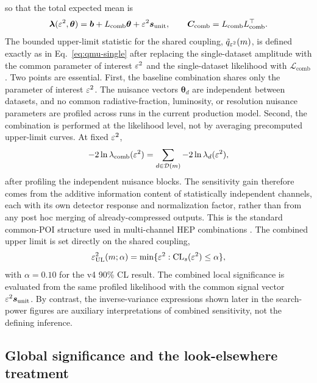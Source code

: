 so that the total expected mean is
\begin{equation}
\bm{\lambda}(\varepsilon^2,\bm{\theta})
= \bm{b} + L_{\mathrm{comb}}\bm{\theta} + \varepsilon^2\bm{s}_{\mathrm{unit}},
\qquad
\bm{C}_{\mathrm{comb}} = L_{\mathrm{comb}}L_{\mathrm{comb}}^\top.
\end{equation}
The bounded upper-limit statistic for the shared coupling,
$\tilde q_{\varepsilon^2}(m)$, is defined exactly as in Eq.~\eqref{eq:qmu-single} after
replacing the single-dataset amplitude with the common parameter of interest
$\varepsilon^2$ and the single-dataset likelihood with
$\mathcal{L}_{\mathrm{comb}}$. Two points are essential. First, the baseline
combination shares only the parameter of interest $\varepsilon^2$. The nuisance vectors
$\bm{\theta}_d$ are independent between datasets, and no common radiative-fraction,
luminosity, or resolution nuisance parameters are profiled across runs in the current
production model. Second, the combination is performed at the likelihood level, not by
averaging precomputed upper-limit curves. At fixed $\varepsilon^2$,
\begin{equation}
-2\ln\lambda_{\mathrm{comb}}(\varepsilon^2)
=
\sum_{d \in \mathcal{D}(m)} -2\ln\lambda_d(\varepsilon^2),
\end{equation}
after profiling the independent nuisance blocks. The sensitivity gain therefore comes
from the additive information content of statistically independent channels, each with
its own detector response and normalization factor, rather than from any post hoc
merging of already-compressed outputs. This is the standard common-POI structure used
in multi-channel HEP combinations \cite{HistFactory,ATLASCMSHiggs2016}. The combined
upper limit is set directly on the shared coupling,
\begin{equation}
\varepsilon^2_{\mathrm{UL}}(m;\alpha)
= \min\{\varepsilon^2 : \mathrm{CL}_s(\varepsilon^2)\le\alpha\},
\end{equation}
with $\alpha=0.10$ for the v4 90\% CL result. The combined local significance is
evaluated from the same profiled likelihood
with the common signal vector $\varepsilon^2 \bm{s}_{\mathrm{unit}}$. By contrast, the
inverse-variance expressions shown later in the search-power figures are auxiliary
interpretations of combined sensitivity, not the defining inference.

\subsection{Global significance and the look-elsewhere treatment}

